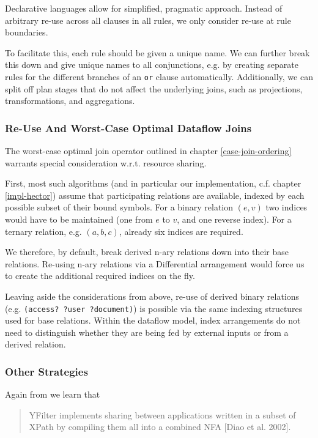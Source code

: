\documentclass[../catalog.tex]{subfiles}
\begin{document}
Declarative languages allow for simplified, pragmatic
approach. Instead of arbitrary re-use across all clauses in all rules,
we only consider re-use at rule boundaries.

To facilitate this, each rule should be given a unique name. We can
further break this down and give unique names to all conjunctions,
e.g. by creating separate rules for the different branches of an
\texttt{or} clause automatically. Additionally, we can split off plan
stages that do not affect the underlying joins, such as projections,
transformations, and aggregations.

\subsubsection{Re-Use And Worst-Case Optimal Dataflow Joins}

The worst-case optimal join operator outlined in chapter
\ref{case-join-ordering} warrants special consideration
w.r.t. resource sharing.

First, most such algorithms (and in particular our implementation,
c.f. chapter \ref{impl-hector}) assume that participating relations
are available, indexed by each possible subset of their bound
symbols. For a binary relation $(e,v)$ two indices would have to be
maintained (one from $e$ to $v$, and one reverse index). For a ternary
relation, e.g. $(a,b,c)$, already six indices are required.

We therefore, by default, break derived n-ary relations down into
their base relations. Re-using n-ary relations via a Differential
arrangement would force us to create the additional required indices
on the fly.

Leaving aside the considerations from above, re-use of derived binary
relations (e.g. \texttt{(access?  ?user ?document)}) is possible via
the same indexing structures used for base relations. Within the
dataflow model, index arrangements do not need to distinguish whether
they are being fed by external inputs or from a derived relation.

\subsubsection{Other Strategies}

Again from \cite{hirzel2014catalog} we learn that

\begin{quote}
YFilter implements sharing between applications written in a subset of
XPath by compiling them all into a combined NFA [Diao et al. 2002].
\end{quote}
\end{document}

